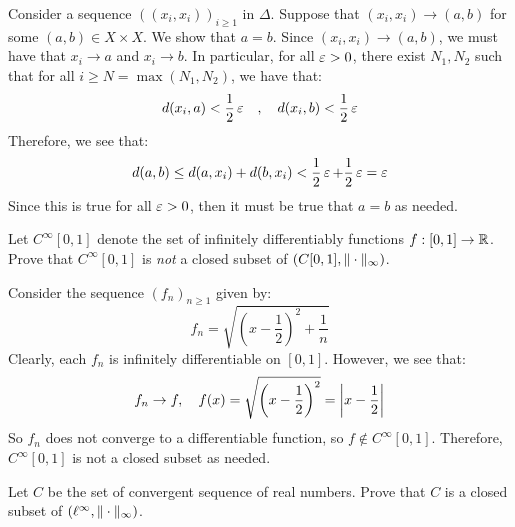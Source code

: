 \documentclass{article}
\begin{document}
\begin{soln}
    Consider a sequence $ ((x_{i}, x_{i}))_{i \geq 1} $ in $ \Delta $.
    Suppose that $ (x_{i}, x_{i}) \rightarrow (a, b) $ for some $ (a, b) \in X \times X $.
    We show that $ a = b $. \vsp
    Since $ (x_{i}, x_{i}) \rightarrow (a, b) $, we must have that $ x_{i} \rightarrow a $
    and $ x_{i} \rightarrow b $. In particular, for all $ \operatorname{\varepsilon} > 0 $, there exist $ N_{1}, N_{2} $
    such that for all $ i \geq N = \max(N_{1}, N_{2}) $, we have that:
    \begin{equation*}
        d(x_{i}, a) < \frac{1}{2}\operatorname{\varepsilon} \quad , \quad d(x_{i}, b) < \frac{1}{2}\operatorname{\varepsilon}
    \end{equation*}
    Therefore, we see that:
    \begin{equation*}
        d(a, b) \leq d(a, x_{i}) + d(b, x_{i}) < \frac{1}{2}\operatorname{\varepsilon} + \frac{1}{2}\operatorname{\varepsilon} = \operatorname{\varepsilon}
    \end{equation*}
    Since this is true for all $ \operatorname{\varepsilon} > 0 $, then it must be true that $ a = b $ as needed.
\end{soln}

\newpage
{}

\begin{qu}
   Let $C^\infty[0,1]$ denote the set of infinitely differentiably functions
   $f:[0,1]\rightarrow \mathbb{R}$. Prove that $C^\infty[0,1]$ is \textit{not} a closed subset of
   $(C[0,1],\|\cdot\|_{\infty})$.
\end{qu}

\begin{soln}
    Consider the sequence $ (f_{n})_{n \geq 1} $ given by:
    \begin{equation*}
        f_{n} = \sqrt{ \left( x - \frac{1}{2} \right)^{2} + \frac{1}{n}}
    \end{equation*}
    Clearly, each $ f_{n} $ is infinitely differentiable on $ [0, 1] $. However, we see that:
    \begin{equation*}
        f_{n} \rightarrow f , \quad f(x) = \sqrt{ \left( x - \frac{1}{2} \right)^{2}}
        = \abs{x - \frac{1}{2}}
    \end{equation*}
    So $ f_{n} $ does not converge to a differentiable function, so $ f \notin C^{\infty}[0, 1] $.
    Therefore, $ C^{\infty}[0, 1] $ is not a closed subset as needed.
\end{soln}

\begin{qu}
    Let $ C $ be the set of convergent sequence of real numbers.
    Prove that $ C $ is a closed subset of $ (\ell^{\infty}, \|\cdot\|_{\infty}) $.
\end{qu}
\end{document}
